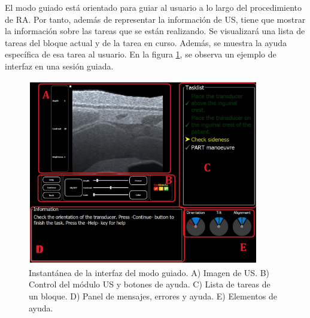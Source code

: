 El modo guiado está orientado para guiar al usuario a lo largo del procedimiento de \ac{RA}. Por tanto, además de representar la información de \ac{US}, tiene que mostrar la información sobre las tareas que se están realizando. Se visualizará una lista de tareas del bloque actual y de la tarea en curso. Además, se muestra la ayuda específica de esa tarea al usuario. En la figura \ref{fig:guidedui}, se observa un ejemplo de interfaz en una sesión guiada.
\begin{figure}[ht]
    \centering
    \includegraphics[width=0.9\textwidth]{IMG/guidedui.PNG}
    \caption{Instantánea de la interfaz del modo guiado. A) Imagen de \acs{US}. B) Control del módulo \acs{US} y botones de ayuda. C) Lista de tareas de un bloque. D) Panel de mensajes, errores y ayuda. E) Elementos de ayuda.}
    \label{fig:guidedui}
\end{figure}

